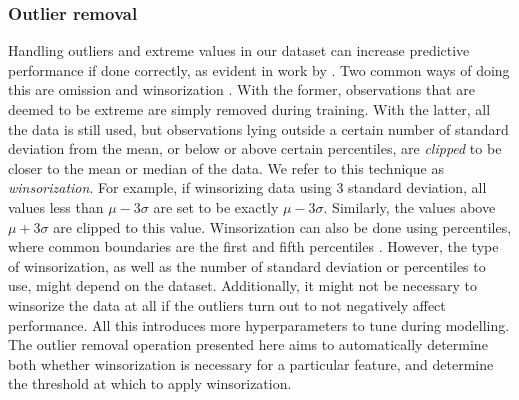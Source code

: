 \documentclass{statsmsc}
\begin{document}
{%
\subsubsection{Outlier removal}%
\label{ssub:Outlier removal}

Handling outliers and extreme values in our dataset can increase predictive performance if done
correctly, as evident in work by \cite{outlier_wind}.
Two common ways of doing this are omission and winsorization
\citep{winsorization}. With the former, observations that are deemed to be extreme are simply
removed during training. With the latter, all the data is still used, but observations lying
outside a certain number of standard deviation from the mean, or below or above certain
percentiles, are \textit{clipped} to be closer to the mean or median of the data. We refer to this
technique as \textit{winsorization}.
For example, if winsorizing data using 3 standard deviation, all values less than
$\mu-3\sigma$ are set to be exactly $\mu-3\sigma$. Similarly, the values above
$\mu+3\sigma$ are clipped to this value. Winsorization can also be done using percentiles,
where common boundaries are the first and fifth percentiles \citep{winsorization}.
However, the type of winsorization, as well as the number of standard deviation
or percentiles to use, might depend on the dataset. Additionally, it might not
be necessary to winsorize the data at all if the outliers turn out to not
negatively affect performance. All this introduces more hyperparameters to tune
during modelling. The outlier removal operation presented here aims to automatically  determine both
whether winsorization is necessary for a particular feature, and determine the threshold at
which to apply winsorization.

}
\end{document}
